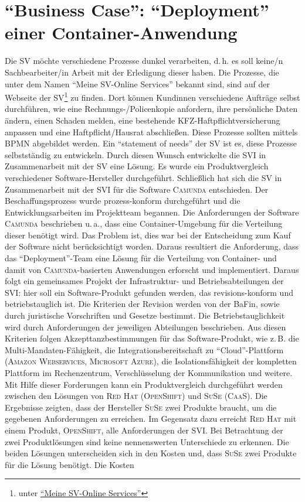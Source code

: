 \section{\enquote{Business Case}: \enquote{Deployment} einer Container-Anwendung}
Die \ac{SV} möchte verschiedene Prozesse dunkel verarbeiten, d.\,h. es soll keine/n Sachbearbeiter/in Arbeit mit der Erledigung dieser haben. Die Prozesse, die unter dem Namen \enquote{Meine \ac{SV}-Online Services} bekannt sind, sind auf der Webseite der \ac{SV}\footnote{unter \href{https://www.sparkassenversicherung.de/content/privatkunden/service/daten/index.html}{\enquote{Meine \ac{SV}-Online Services}}} zu finden. Dort können Kundinnen verschiedene Aufträge selbst durchführen, wie eine Rechnungs-/Policenkopie anfordern, ihre persönliche Daten ändern, einen Schaden melden, eine bestehende KFZ-Haftpflichtversicherung anpassen und eine Haftpflicht/Hausrat abschließen. Diese Prozesse sollten mittels \ac{BPMN} abgebildet werden. Ein \enquote{statement of needs} der \ac{SV} ist es, diese Prozesse selbstständig zu entwickeln. Durch diesen Wunsch entwickelte die \ac{SVI} in Zusammenarbeit mit der \ac{SV} eine Lösung. Es wurde ein Produktvergleich verschiedener Software-Hersteller durchgeführt. Schließlich hat sich die \ac{SV} in Zusammenarbeit mit der \ac{SVI} für die Software \textsc{Camunda} entschieden. Der Beschaffungsprozess wurde prozess-konform durchgeführt und die Entwicklungsarbeiten im Projektteam begannen. Die Anforderungen der Software \textsc{Camunda} beschrieben u.\,a., dass eine Container-Umgebung für die Verteilung dieser benötigt wird. Das Problem ist, dies war bei der Entscheidung zum Kauf der Software nicht berücksichtigt worden. Daraus resultiert die Anforderung, dass das \enquote{Deployment}-Team eine Lösung für die Verteilung von Container- und damit von \textsc{Camunda}-basierten Anwendungen erforscht und implementiert. Daraus folgt ein gemeinsames Projekt der Infrastruktur- und Betriebsabteilungen der \ac{SVI}: hier soll ein Software-Produkt gefunden werden, das revisions-konform und betriebstauglich ist. Die Kriterien der Revision werden von der \ac{BaFin}, sowie durch juristische Vorschriften und Gesetze bestimmt. Die Betriebstauglichkeit wird durch Anforderungen der jeweiligen Abteilungen beschrieben. Aus diesen Kriterien folgen Akzepttanzbestimmungen für das Software-Produkt, wie z.\,B. die Multi-Mandaten-Fähigkeit, die Integrationsbereitschaft zu \enquote{Cloud}-Plattform (\textsc{Amazon Webservices}, \textsc{Microsoft Azure}), die Isolationsfähigkeit der kompletten Plattform im Rechenzentrum, Verschlüsselung der Kommunikation und weitere. Mit Hilfe dieser Forderungen kann ein Produktvergleich durchgeführt werden zwischen den Lösungen von \textsc{Red Hat} (\textsc{OpenShift}) und \textsc{SuSe} (\textsc{CaaS}). Die Ergebnisse zeigten, dass der Hersteller \textsc{SuSe} zwei Produkte braucht, um die gegebenen Anforderungen zu erreichen. Im Gegensatz dazu erreicht \textsc{Red Hat} mit einem Produkt, \textsc{OpenShift}, alle Anforderungen der \ac{SVI}. Bei Betrachtung der zwei Produktlösungen sind keine nennenswerten Unterschiede zu erkennen. Die beiden Lösungen unterscheiden sich in den Kosten und, dass \textsc{SuSe} zwei Produkte für die Lösung benötigt. Die Kosten 